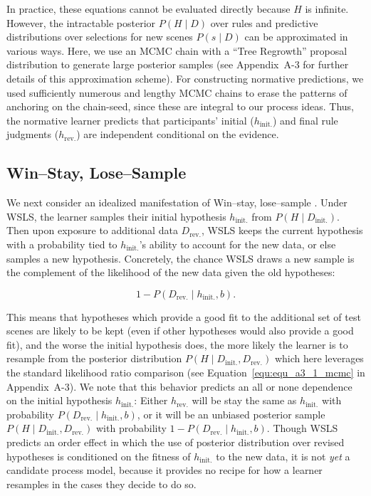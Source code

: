 \documentclass[doc,natbib,floatsintext]{apa7}
\newcommand{\dr}{D_{\mathrm{rev.}}}%
\newcommand{\di}{D_{\mathrm{init.}}}%
\newcommand{\hr}{h_{\mathrm{rev.}}}
\newcommand{\hi}{h_{\mathrm{init.}}}
\begin{document}
In practice, these equations cannot be evaluated directly because $H$ is infinite. However, the intractable posterior $P(H\mid D)$ over rules and predictive distributions over selections for new scenes $P(s\mid D)$ can be approximated in various ways. Here, we use an MCMC chain with a ``Tree Regrowth'' proposal distribution \citep{goodman2008rational} to generate large posterior samples (see Appendix~A-3 for further details of this approximation scheme). For constructing normative predictions, we used sufficiently numerous and lengthy MCMC chains to erase the patterns of anchoring on the chain-seed, since these are integral to our process ideas. Thus, the normative learner predicts that participants' initial ($\hi$) and final rule judgments ($\hr$) are independent conditional on the evidence.

\subsection{Win--Stay, Lose--Sample}
We next consider an idealized manifestation of Win--stay, lose--sample \citep[WSLS,][]{bonawitz2014win}. Under WSLS, the learner samples their initial hypothesis $\hi$ from $P(H\mid \di)$. Then upon exposure to additional data $\dr$, WSLS keeps the current hypothesis with a probability tied to $\hi$'s ability to account for the new data, or else samples a new hypothesis. Concretely, the chance WSLS draws a new sample is the complement of the likelihood of the new data given the old hypotheses: 

\begin{equation}
    1 - P(\dr \mid \hi, b).
\label{equ:equ_6_wsls}
\end{equation}

This means that hypotheses which provide a good fit to the additional set of test scenes are likely to be kept (even if other hypotheses would also provide a good fit), and the worse the initial hypothesis does, the more likely the learner is to resample from the posterior distribution $P(H\mid \di,\dr)$ which here leverages the standard likelihood ratio comparison (see Equation~\ref{equ:equ_a3_1_mcmc} in Appendix~A-3). We note that this behavior predicts an all or none dependence on the initial hypothesis $\hi$: Either $\hr$ will be stay the same as $\hi$ with probability $P(\dr\mid \hi, b)$, or it will be an unbiased posterior sample $P(H\mid\di,\dr)$ with probability $1 - P(\dr\mid\hi,b)$. Though WSLS predicts an order effect in which the use of posterior distribution over revised hypotheses is conditioned on the fitness of $\hi$ to the new data, it is not \emph{yet} a candidate process model, because it provides no recipe for how a learner resamples in the cases they decide to do so. 
\end{document}
